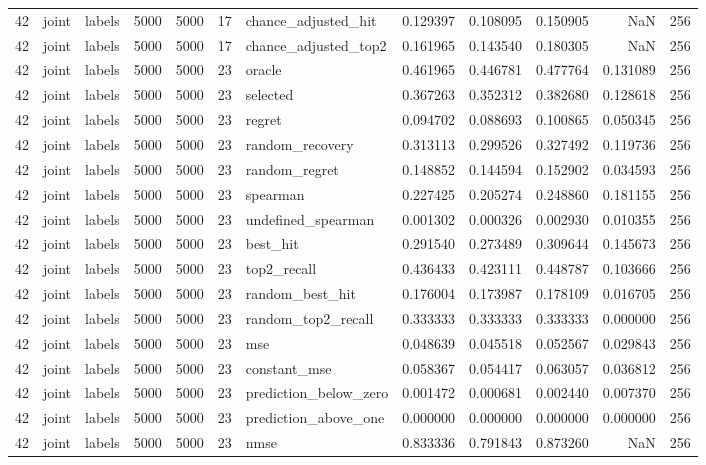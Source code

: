 \begin{tabular}{rllrrrlrrrrr}
42 & joint & labels & 5000 & 5000 & 17 & chance_adjusted_hit & 0.129397 & 0.108095 & 0.150905 & NaN & 256 \\
42 & joint & labels & 5000 & 5000 & 17 & chance_adjusted_top2 & 0.161965 & 0.143540 & 0.180305 & NaN & 256 \\
42 & joint & labels & 5000 & 5000 & 23 & oracle & 0.461965 & 0.446781 & 0.477764 & 0.131089 & 256 \\
42 & joint & labels & 5000 & 5000 & 23 & selected & 0.367263 & 0.352312 & 0.382680 & 0.128618 & 256 \\
42 & joint & labels & 5000 & 5000 & 23 & regret & 0.094702 & 0.088693 & 0.100865 & 0.050345 & 256 \\
42 & joint & labels & 5000 & 5000 & 23 & random_recovery & 0.313113 & 0.299526 & 0.327492 & 0.119736 & 256 \\
42 & joint & labels & 5000 & 5000 & 23 & random_regret & 0.148852 & 0.144594 & 0.152902 & 0.034593 & 256 \\
42 & joint & labels & 5000 & 5000 & 23 & spearman & 0.227425 & 0.205274 & 0.248860 & 0.181155 & 256 \\
42 & joint & labels & 5000 & 5000 & 23 & undefined_spearman & 0.001302 & 0.000326 & 0.002930 & 0.010355 & 256 \\
42 & joint & labels & 5000 & 5000 & 23 & best_hit & 0.291540 & 0.273489 & 0.309644 & 0.145673 & 256 \\
42 & joint & labels & 5000 & 5000 & 23 & top2_recall & 0.436433 & 0.423111 & 0.448787 & 0.103666 & 256 \\
42 & joint & labels & 5000 & 5000 & 23 & random_best_hit & 0.176004 & 0.173987 & 0.178109 & 0.016705 & 256 \\
42 & joint & labels & 5000 & 5000 & 23 & random_top2_recall & 0.333333 & 0.333333 & 0.333333 & 0.000000 & 256 \\
42 & joint & labels & 5000 & 5000 & 23 & mse & 0.048639 & 0.045518 & 0.052567 & 0.029843 & 256 \\
42 & joint & labels & 5000 & 5000 & 23 & constant_mse & 0.058367 & 0.054417 & 0.063057 & 0.036812 & 256 \\
42 & joint & labels & 5000 & 5000 & 23 & prediction_below_zero & 0.001472 & 0.000681 & 0.002440 & 0.007370 & 256 \\
42 & joint & labels & 5000 & 5000 & 23 & prediction_above_one & 0.000000 & 0.000000 & 0.000000 & 0.000000 & 256 \\
42 & joint & labels & 5000 & 5000 & 23 & nmse & 0.833336 & 0.791843 & 0.873260 & NaN & 256 \\

\end{tabular}
